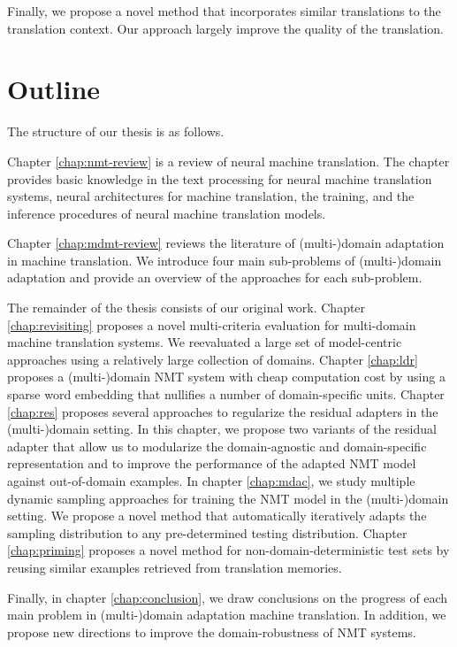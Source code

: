 Finally, we propose a novel method that incorporates similar translations to the translation context. Our approach largely improve the quality of the translation.

\section{Outline}
The structure of our thesis is as follows.

Chapter \ref{chap:nmt-review} is a review of neural machine translation. The chapter provides basic knowledge in the text processing for neural machine translation systems, neural architectures for machine translation, the training, and the inference procedures of neural machine translation models.

Chapter \ref{chap:mdmt-review} reviews the literature of (multi-)domain adaptation in machine translation. We introduce four main sub-problems of (multi-)domain adaptation and provide an overview of the approaches for each sub-problem.

The remainder of the thesis consists of our original work. Chapter \ref{chap:revisiting} proposes a novel multi-criteria evaluation for multi-domain machine translation systems. We reevaluated a large set of model-centric approaches using a relatively large collection of domains. Chapter \ref{chap:ldr} proposes a (multi-)domain NMT system with cheap computation cost by using a sparse word embedding that nullifies a number of domain-specific units. Chapter \ref{chap:res} proposes several approaches to regularize the residual adapters \citep{Bapna19simple} in the (multi-)domain setting. In this chapter, we propose two variants of the residual adapter that allow us to modularize the domain-agnostic and domain-specific representation and to improve the performance of the adapted NMT model against out-of-domain examples. In chapter \ref{chap:mdac}, we study multiple dynamic sampling approaches for training the NMT model in the (multi-)domain setting. We propose a novel method that automatically iteratively adapts the sampling distribution to any pre-determined testing distribution. Chapter \ref{chap:priming} proposes a novel method for non-domain-deterministic test sets by reusing similar examples retrieved from translation memories.

Finally, in chapter \ref{chap:conclusion}, we draw conclusions on the progress of each main problem in (multi-)domain adaptation machine translation. In addition, we propose new directions to improve the domain-robustness of NMT systems.


























